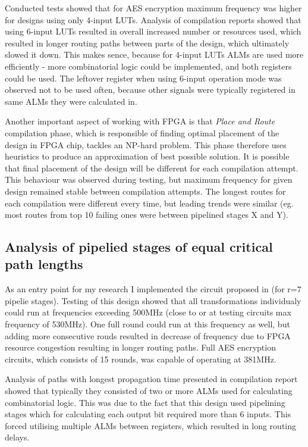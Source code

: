 Conducted tests showed that for AES encryption maximum frequency was higher for designs using only 4-input LUTs. Analysis of compilation reports showed that using 6-input LUTs resulted in overall increased number or resources used, which resulted in longer routing paths between parts of the design, which ultimately slowed it down. This makes sence, because for 4-input LUTs ALMs are used more efficiently - more combinatorial logic could be implemented, and both registers could be used. The leftover register when using 6-input operation mode was observed not to be used often, because other signals were typically registered in same ALMs they were calculated in.

Another important aspect of working with FPGA is that \textit{Place and Route} compilation phase, which is responsible of finding optimal placement of the design in FPGA chip, tackles an NP-hard problem. This phase therefore uses heuristics to produce an approximation of best possible solution. It is possible that final placement of the design will be different for each compilation attempt. This behaviour was observed during testing, but maximum frequency for given design remained stable between compilation attempts. The longest routes for each compilation were different every time, but leading trends were similar (eg. most routes from top 10 failing ones were between pipelined stages X and Y).



\subsection{Analysis of pipelied stages of equal critical path lengths}
As an entry point for my research I implemented the circuit proposed in \cite{dupa} (for r=7 pipelie stages). Testing of this design showed that all transformations individualy could run at frequencies exceeding 500MHz (close to or at testing circuits max frequency of 530MHz). One full round could run at this frequency as well, but adding more consecutive rouds resulted in decrease of frequency due to FPGA resource congestion resulting in longer routing paths. Full AES encryption circuits, which consists of 15 rounds, was capable of operating at 381MHz.

Analysis of paths with longest propagation time presented in compilation report showed that typically they consisted of two or more ALMs used for calculating combinatorial logic. This was due to the fact that this design used pipelining stages which for calculating each output bit required more than 6 inputs. This forced utilising multiple ALMs between registers, which resulted in long routing delays.

